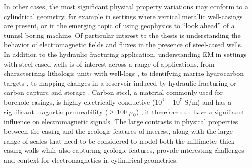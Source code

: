 In other cases, the most significant physical property variations may conform to a cylindrical geometry, for example in settings where vertical metallic well-casings are present, or in the emerging topic of using geophysics to ``look ahead'' of a tunnel boring machine. Of particular interest to the thesis is understanding the behavior of electromagnetic fields and fluxes in the presence of steel-cased wells. In addition to the hydraulic fracturing application, understanding EM in settings with steel-cased wells is of interest across a range of applications, from characterizing lithologic units with well-logs \citep{Kaufman1990, Kaufman1993, Augustin1989}, to identifying marine hydrocarbon targets \citep{Kong2009, Swidinsky2013, Tietze2015}, to mapping changes in a reservoir induced by hydraulic fracturing or carbon capture and storage \citep{Pardo2013, Borner2015, Um2015, Weiss2016, hoversten2017borehole, Zhang2018}. Carbon steel, a material commonly used for borehole casings, is highly electrically conductive ($10^6 - 10^7$ S/m) and has a significant magnetic permeability ($\geq 100$ $\mu_0$) \citep{wuhabashy1994}; it therefore can have a significant influence on electromagnetic signals. The large contrasts in physical properties between the casing and the geologic features of interest, along with the large range of scales that need to be considered to model both the millimeter-thick casing walls while also capturing geologic features, provide interesting challenges and context for electromagnetics in cylindrical geometries.

